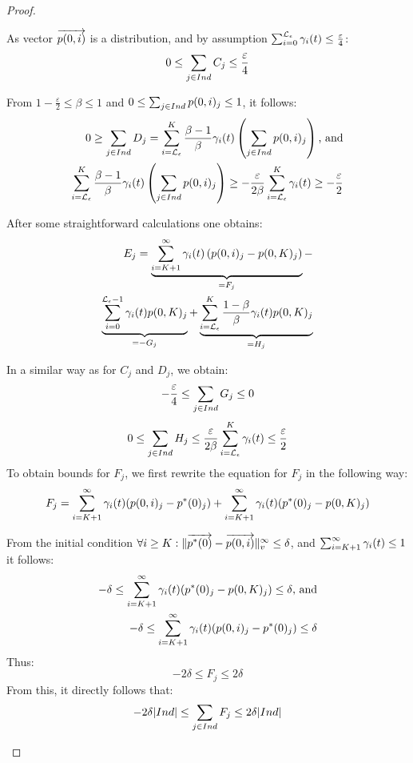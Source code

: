 \documentclass{entcs}
\begin{document}
{\begin{proof}
\begin{enumerate}
					As vector $\overrightarrow{p(0,i)}$ is a distribution, and by assumption $\sum_{i=0}^{\mathcal{L}_{\epsilon}}\gamma_{i}(t) \leq \frac{\varepsilon}{4}$:
					\[
						 0 \leq \sum_{j \in Ind} C_{j} \leq \frac{\varepsilon}{4}
					\]

					From $1- \frac{\varepsilon}{2} \leq \beta \leq 1$ and $0 \leq \sum_{j \in Ind} p(0,i)_{j} \leq 1$, it follows:
					\begin{eqnarray}
						0 \geq \sum_{j \in Ind} D_{j}  = \sum_{i=\mathcal{L}_{\epsilon}}^{K} \frac{\beta - 1}{\beta} \gamma_{i}(t) \left( \sum_{j \in Ind} p(0,i)_{j} \right) \text{, and} \nonumber \\
						\sum_{i=\mathcal{L}_{\epsilon}}^{K} \frac{\beta - 1}{\beta} \gamma_{i}(t) \left( \sum_{j \in Ind} p(0,i)_{j} \right) \geq - \frac{\varepsilon}{2 \beta} \sum_{i=\mathcal{L}_{\epsilon}}^{K} \gamma_{i}(t) \geq - \frac{\varepsilon}{2} \nonumber
					\end{eqnarray}

					After some straightforward calculations one obtains:
					\begin{eqnarray}
						E_{j} = \underbrace{\sum_{i=K+1}^{\infty}\gamma_{i}(t) \left( p(0,i)_{j} - p(0,K)_{j} \right)}_{ = F_{j}} - \nonumber \\
						\underbrace{\sum_{i=0}^{\mathcal{L}_{\epsilon}-1}\gamma_{i}(t) p(0,K)_{j}}_{= -G_{j}} + \underbrace{\sum_{i=\mathcal{L}_{\epsilon}}^{K}\frac{1- \beta}{\beta} \gamma_{i}(t) p(0,K)_{j}}_{ = H_{j}} \nonumber
					\end{eqnarray}

					In a similar way as for $C_{j}$ and $D_{j}$, we obtain:
					\[
						- \frac{\varepsilon}{4} \leq \sum_{j \in Ind} G_{j} \leq 0
					\]
					\[
						 0 \leq \sum_{j \in Ind} H_{j} \leq \frac{\varepsilon}{2 \beta} \sum_{i=\mathcal{L}_{\epsilon}}^{K} \gamma_{i}(t) \leq \frac{\varepsilon}{2}
					\]
						To obtain bounds for $F_{j}$, we first rewrite the equation for $F_{j}$ in the following way:
					\begin{eqnarray}
						F_{j} = \sum_{i=K+1}^{\infty}\gamma_{i}(t) (p(0,i)_{j} - p^{*}(0)_{j}) +  \sum_{i=K+1}^{\infty} \gamma_{i}(t) (p^{*}(0)_{j} - p(0,K)_{j}) \nonumber
					\end{eqnarray}
							
					From the initial condition $\forall i \geq K : \lVert  \overrightarrow{p^{*}(0)} - \overrightarrow{p(0,i)}  \rVert_{v}^{\infty} \leq \delta$, and $\sum_{i=K+1}^{\infty}\gamma_{i}(t) \leq 1$ it follows:  
					\begin{eqnarray}
						- \delta \leq \sum_{i=K+1}^{\infty} \gamma_{i}(t) (p^{*}(0)_{j} - p(0,K)_{j}) \leq \delta \nonumber \text{, and} \nonumber \\
						 - \delta \leq \sum_{i=K+1}^{\infty}\gamma_{i}(t) (p(0,i)_{j} - p^{*}(0)_{j}) \leq \delta \nonumber
					\end{eqnarray}
					Thus:
					\[
						- 2 \delta \leq F_{j} \leq 2 \delta
					\]
					From this, it directly follows that:
					\[
						- 2 \delta |Ind| \leq \sum_{j \in Ind} F_{j} \leq 2 \delta | Ind |
					\]


\end{enumerate}
\end{proof}}
\end{document}
